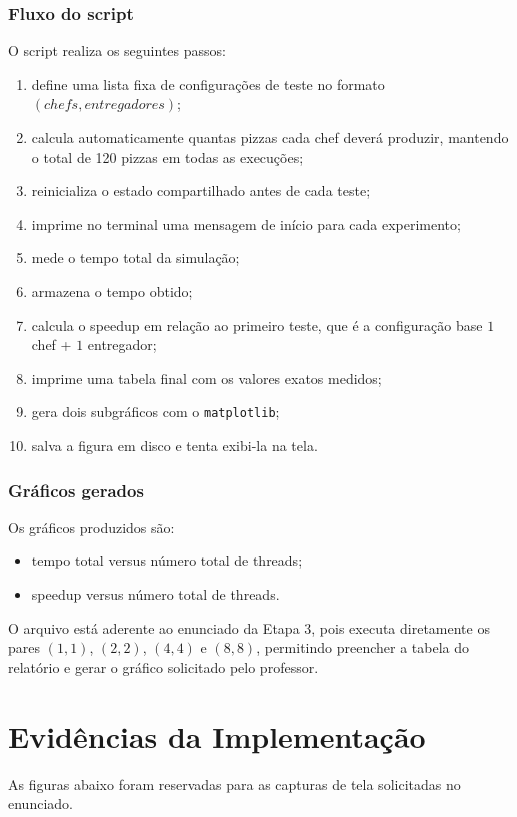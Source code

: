 \documentclass[12pt,a4paper]{article}
\begin{document}
\subsubsection{Fluxo do script}
O script realiza os seguintes passos:
\begin{enumerate}
    \item define uma lista fixa de configura\c{c}\~oes de teste no formato \((chefs, entregadores)\);
    \item calcula automaticamente quantas pizzas cada chef dever\'a produzir, mantendo o total de 120 pizzas em todas as execu\c{c}\~oes;
    \item reinicializa o estado compartilhado antes de cada teste;
    \item imprime no terminal uma mensagem de in\'icio para cada experimento;
    \item mede o tempo total da simula\c{c}\~ao;
    \item armazena o tempo obtido;
    \item calcula o speedup em rela\c{c}\~ao ao primeiro teste, que \'e a configura\c{c}\~ao base \(1\) chef + \(1\) entregador;
    \item imprime uma tabela final com os valores exatos medidos;
    \item gera dois subgr\'aficos com o \texttt{matplotlib};
    \item salva a figura em disco e tenta exibi-la na tela.
\end{enumerate}

\subsubsection{Gr\'aficos gerados}
Os gr\'aficos produzidos s\~ao:
\begin{itemize}
    \item tempo total versus n\'umero total de threads;
    \item speedup versus n\'umero total de threads.
\end{itemize}

O arquivo est\'a aderente ao enunciado da Etapa 3, pois executa diretamente os pares \((1,1)\), \((2,2)\), \((4,4)\) e \((8,8)\), permitindo preencher a tabela do relat\'orio e gerar o gr\'afico solicitado pelo professor.

\section{Evid\^encias da Implementa\c{c}\~ao}
As figuras abaixo foram reservadas para as capturas de tela solicitadas no enunciado.
\end{document}
